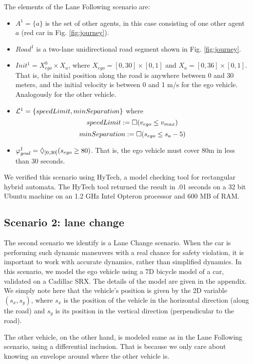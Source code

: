The elements of the Lane Following scenario are:
\begin{itemize}
	\item $A^1 = \{a\}$ is the set of other agents, in this case consisting of one other agent $a$ (red car in Fig. \ref{fig:journey}).
	\item $Road^1$ is a two-lane unidirectional road segment shown in Fig. \ref{fig:journey}.
	\item $Init^1 = X_{ego}^0 \times X_a$, where 
	$X_{ego} = [0,30] \times [0,1]$ and
	$X_a = [0,36] \times [0,1]$.
	That is, the initial position along the road is anywhere between 0 and 30 meters, and the initial velocity is between 0 and 1 m/s for the ego vehicle. 
	Analogously for the other vehicle.
	\item $\mathcal{L}^1 = \{speedLimit, minSeparation\}$ where
	\[speedLimit := \square (v_{ego} \leq v_{max})\]
	\[minSeparation := \square (s_{ego} \leq s_a - 5)\]
	\item $\varphi_{goal}^1 = \Diamond_{[0,30]}(s_{ego} \geq 80)$.
	That is, the ego vehicle must cover 80m in less than 30 seconds.
\end{itemize}

We verified this scenario using HyTech, a model checking tool for rectangular hybrid automata.
The HyTech tool returned the result in .01 seconds on a 32 bit Ubuntu machine on an 1.2 GHz Intel Opteron processor and 600 MB of RAM.

\subsection{Scenario 2: lane change}
The second scenario we identify is a Lane Change scenario.
When the car is performing such dynamic maneuvers with a real chance for safety violation, it is important to work with accurate dynamics, rather than simplified dynamics. 
In this scenario, we model the ego vehicle using a 7D bicycle model of a car, validated on a Cadillac SRX. 
The details of the model are given in the appendix.
We simply note here that the vehicle's position is given by the 2D variable $(s_x,s_y)$, where $s_x$ is the position of the vehicle in the horizontal direction (along the road) and $s_y$ is its position in the vertical direction (perpendicular to the road). 

The other vehicle, on the other hand, is modeled same as in the Lane Following scenario, using a differential inclusion. 
That is because we only care about knowing an envelope around where the other vehicle is.

